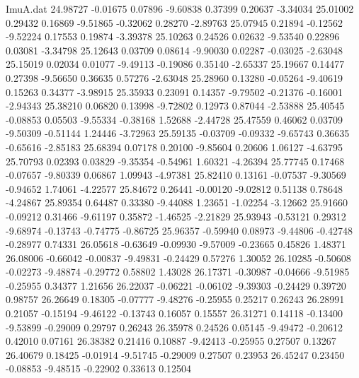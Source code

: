 \begin{filecontents}{ImuA.dat}
  24.98727   -0.01675    0.07896   -9.60838    0.37399    0.20637   -3.34034
  25.01002    0.29432    0.16869   -9.51865   -0.32062    0.28270   -2.89763
  25.07945    0.21894   -0.12562   -9.52224    0.17553    0.19874   -3.39378
  25.10263    0.24526    0.02632   -9.53540    0.22896    0.03081   -3.34798
  25.12643    0.03709    0.08614   -9.90030    0.02287   -0.03025   -2.63048
  25.15019    0.02034    0.01077   -9.49113   -0.19086    0.35140   -2.65337
  25.19667    0.14477    0.27398   -9.56650    0.36635    0.57276   -2.63048
  25.28960    0.13280   -0.05264   -9.40619    0.15263    0.34377   -3.98915
  25.35933    0.23091    0.14357   -9.79502   -0.21376   -0.16001   -2.94343
  25.38210    0.06820    0.13998   -9.72802    0.12973    0.87044   -2.53888
  25.40545   -0.08853    0.05503   -9.55334   -0.38168    1.52688   -2.44728
  25.47559    0.46062    0.03709   -9.50309   -0.51144    1.24446   -3.72963
  25.59135   -0.03709   -0.09332   -9.65743    0.36635   -0.65616   -2.85183
  25.68394    0.07178    0.20100   -9.85604    0.20606    1.06127   -4.63795
  25.70793    0.02393    0.03829   -9.35354   -0.54961    1.60321   -4.26394
  25.77745    0.17468   -0.07657   -9.80339    0.06867    1.09943   -4.97381
  25.82410    0.13161   -0.07537   -9.30569   -0.94652    1.74061   -4.22577
  25.84672    0.26441   -0.00120   -9.02812    0.51138    0.78648   -4.24867
  25.89354    0.64487    0.33380   -9.44088    1.23651   -1.02254   -3.12662
  25.91660   -0.09212    0.31466   -9.61197    0.35872   -1.46525   -2.21829
  25.93943   -0.53121    0.29312   -9.68974   -0.13743   -0.74775   -0.86725
  25.96357   -0.59940    0.08973   -9.44806   -0.42748   -0.28977    0.74331
  26.05618   -0.63649   -0.09930   -9.57009   -0.23665    0.45826    1.48371
  26.08006   -0.66042   -0.00837   -9.49831   -0.24429    0.57276    1.30052
  26.10285   -0.50608   -0.02273   -9.48874   -0.29772    0.58802    1.43028
  26.17371   -0.30987   -0.04666   -9.51985   -0.25955    0.34377    1.21656
  26.22037   -0.06221   -0.06102   -9.39303   -0.24429    0.39720    0.98757
  26.26649    0.18305   -0.07777   -9.48276   -0.25955    0.25217    0.26243
  26.28991    0.21057   -0.15194   -9.46122   -0.13743    0.16057    0.15557
  26.31271    0.14118   -0.13400   -9.53899   -0.29009    0.29797    0.26243
  26.35978    0.24526    0.05145   -9.49472   -0.20612    0.42010    0.07161
  26.38382    0.21416    0.10887   -9.42413   -0.25955    0.27507    0.13267
  26.40679    0.18425   -0.01914   -9.51745   -0.29009    0.27507    0.23953
  26.45247    0.23450   -0.08853   -9.48515   -0.22902    0.33613    0.12504

\end{filecontents}

